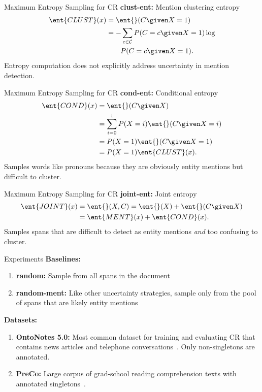 \begin{frame}{Maximum Entropy Sampling for CR}
\textbf{clust-ent:} Mention clustering entropy
\begin{align}
    \ent{CLUST}(x)
        &= \ent{}(C \given X = 1) \\
        &= -\sum_{c \in \mathcal{C}} P(C = c \given X =
    1) \log \nonumber \\
    & \qquad P(C = c \given X = 1). \nonumber
\end{align}
\vfill
Entropy computation does not explicitly address uncertainty in mention
detection.
\end{frame}

\begin{frame}{Maximum Entropy Sampling for CR}
\textbf{cond-ent:} Conditional entropy
\begin{equation}
\begin{split}
    \ent{COND}(x)
        &= \ent{}(C \given X) \\
        &= \sum_{i=0}^1 P(X=i) \ent{}(C \given X = i) \\
        &= P(X=1) \ent{}(C \given X=1) \\
        &= P(X=1) \ent{CLUST}(x).
\end{split}
\end{equation}
\vfill
Samples words like pronouns because they are obviously entity mentions but
difficult to cluster.
\end{frame}


\begin{frame}{Maximum Entropy Sampling for CR}
\textbf{joint-ent:} Joint entropy
\begin{align}
    \ent{JOINT}(x)
        &= \ent{}(X,C) = \ent{}(X) + \ent{}(C \given X) \nonumber \\
        &= \ent{MENT}(x) + \ent{COND}(x).
\end{align}
\vfill
Samples spans that are difficult to detect as entity mentions \emph{and}
too confusing to cluster.
\end{frame}

\begin{frame}{Experiments}
    \textbf{Baselines:}
\begin{enumerate}
\item \textbf{random:} Sample from all spans in the document
\item \textbf{random-ment:} Like other uncertainty strategies, sample only from
the pool of spans that are likely entity mentions
\end{enumerate}
\vfill
{}
    \textbf{Datasets:}
    \begin{enumerate}
    \item \textbf{OntoNotes 5.0:} Most common dataset for training and evaluating
        CR that contains news articles and telephone
            conversations~\citep{pradhan-2013}. Only non-singletons are
            annotated.
    \item \textbf{PreCo:} Large corpus of grad-school reading comprehension
        texts with annotated singletons~\citep{chen-2018}.
    \end{enumerate}
\end{frame}

